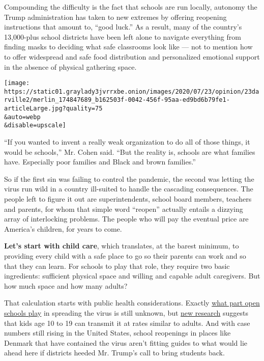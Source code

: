 Compounding the difficulty is the fact that schools are run locally,
autonomy the Trump administration has taken to new extremes by offering
reopening instructions that amount to, ``good luck.'' As a result, many
of the country's 13,000-plus school districts have been left alone to
navigate everything from finding masks to deciding what safe classrooms
look like --- not to mention how to offer widespread and safe food
distribution and personalized emotional support in the absence of
physical gathering space.

\texttt{[image: https://static01.graylady3jvrrxbe.onion/images/2020/07/23/opinion/23darville2/merlin\_174847689\_b162503f-0042-456f-95aa-ed9bd6b79fe1-articleLarge.jpg?quality=75\\\&auto=webp\\\&disable=upscale]}

``If you wanted to invent a really weak organization to do all of those
things, it would be schools,'' Mr. Cohen said. ``But the reality is,
schools are what families have. Especially poor families and Black and
brown families.''

So if the first sin was failing to control the pandemic, the second was
letting the virus run wild in a country ill-suited to handle the
cascading consequences. The people left to figure it out are
superintendents, school board members, teachers and parents, for whom
that simple word ``reopen'' actually entails a dizzying array of
interlocking problems. The people who will pay the eventual price are
America's children, for years to come.

\textbf{Let's start with child care}, which translates, at the barest
minimum, to providing every child with a safe place to go so their
parents can work and so that they can learn. For schools to play that
role, they require two basic ingredients: sufficient physical space and
willing and capable adult caregivers. But how much space and how many
adults?

That calculation starts with public health considerations. Exactly
\href{https://www.nytimes3xbfgragh.onion/2020/07/11/health/coronavirus-schools-reopen.html}{what
part open schools play} in spreading the virus is still unknown, but
\href{https://www.nytimes3xbfgragh.onion/2020/07/18/health/coronavirus-children-schools.html?action=click\&module=Top\%20Stories\&pgtype=Homepage}{new
research} suggests that kids age 10 to 19 can transmit it at rates
similar to adults. And with case numbers still rising in the United
States, school reopenings in places like Denmark that have contained the
virus aren't fitting guides to what would lie ahead here if districts
heeded Mr. Trump's call to bring students back.

